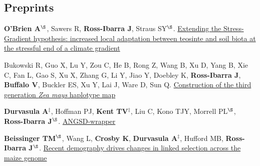 \documentclass[letterpaper]{article}
\renewenvironment{itemize}{
  \begin{list}{}{
    \setlength{\leftmargin}{1.5em}
  }
}{
  \end{list}
}
\begin{document}
\subsection*{Preprints}
\begin{itemize}

\item {\bf O'Brien A}$^\S$, Sawers R, {\bf Ross-Ibarra J}, Straus SY$^\S$. \href{http://biorxiv.org/content/early/2015/11/11/031195?utm_source=dlvr.it&utm_medium=twitter}{Extending the Stress-Gradient hypothesis: increased local adaptation between teosinte and soil biota at the stressful end of a climate gradient}

\item Bukowski R, Guo X, Lu Y, Zou C, He B, Rong Z, Wang B,  Xu D,  Yang B, Xie C,  Fan L, Gao S, Xu X, Zhang G, Li Y, Jiao Y, Doebley K, {\bf Ross-Ibarra J}, {\bf Buffalo V}, Buckler ES, Xu Y,  Lai J, Ware D, Sun Q. \href{http://biorxiv.org/content/early/2015/09/16/026963}{Construction of the third generation \emph{Zea mays} haplotype map}  

\item {\bf Durvasula A}$^\ddagger$,  Hoffman PJ, {\bf Kent TV}$^\ddagger$, Liu C, Kono TJY, Morrell PL$^\S$, {\bf Ross-Ibarra J}$^\S$. \href{https://peerj.com/preprints/1472/}{ANGSD-wrapper}

\item {\bf Beissinger TM}$^\S$, Wang L, {\bf Crosby K}, {\bf Durvasula A}$^\ddagger$, Hufford MB, {\bf Ross-Ibarra J}$^\S$.  \href{http://biorxiv.org/content/early/2015/11/13/031666}{Recent demography drives changes in linked selection across the maize genome}  

\end{itemize}

\end{document}
